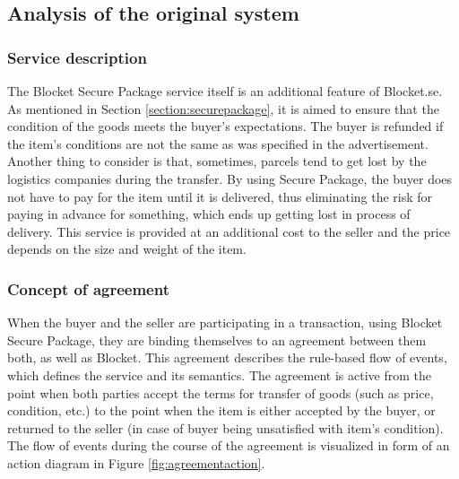 \subsection{Analysis of the original system} \label{section:improvementsfromoriginal}

\subsubsection{Service description}
The Blocket Secure Package service itself is an additional feature of Blocket.se. As mentioned in Section \ref{section:securepackage}, it is aimed to ensure that the condition of the goods meets the buyer's expectations. The buyer is refunded if the item's conditions are not the same as was specified in the advertisement. Another thing to consider is that, sometimes, parcels tend to get lost by the logistics companies during the transfer. By using Secure Package, the buyer does not have to pay for the item until it is delivered, thus eliminating the risk for paying in advance for something, which ends up getting lost in process of delivery. This service is provided at an additional cost to the seller and the price depends on the size and weight of the item.

\subsubsection{Concept of agreement}
When the buyer and the seller are participating in a transaction, using Blocket Secure Package, they are binding themselves to an agreement between them both, as well as Blocket. This agreement describes the rule-based flow of events, which defines the service and its semantics. The agreement is active from the point when both parties accept the terms for transfer of goods (such as price, condition, etc.) to the point when the item is either accepted by the buyer, or returned to the seller (in case of buyer being unsatisfied with item's condition). The flow of events during the course of the agreement is visualized in form of an action diagram in Figure \ref{fig:agreementaction}.

